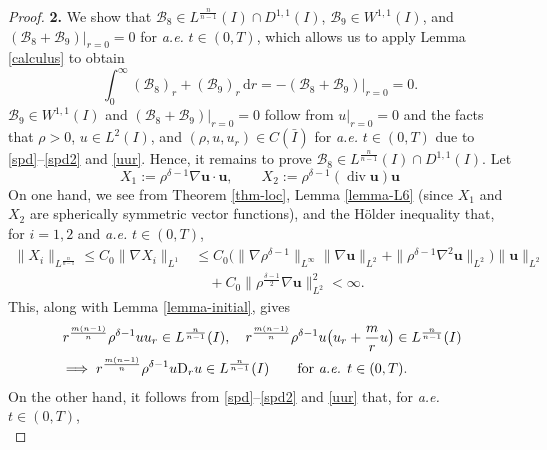 \documentclass[11pt,reqno]{amsart}
\DeclareMathOperator{\diver}{\mathrm{div}}
\numberwithin{rk}{section}
\numberwithin{prop}{section}
\numberwithin{mydef}{section}
\numberwithin{lem}{section}
\numberwithin{equation}{section}
\numberwithin{thm}{section}
\begin{document}
\begin{proof}
\smallskip
\textbf{2.} We show that $\mathcal{B}_8\in L^\frac{n}{n-1}(I)\cap D^{1,1}(I)$, $\mathcal{B}_9\in W^{1,1}(I)$, and $(\mathcal{B}_8+\mathcal{B}_9)|_{r=0}=0$ for {\it a.e.} 
$t\in (0,T)$, which allows us to apply Lemma \ref{calculus} to obtain
\begin{equation}\label{int-B8B9}
\int_0^\infty (\mathcal{B}_8)_r+(\mathcal{B}_9)_r\,\mathrm{d}r=-(\mathcal{B}_8+\mathcal{B}_9)|_{r=0}=0.
\end{equation}
$\mathcal{B}_9\in W^{1,1}(I)$ and $(\mathcal{B}_8+\mathcal{B}_9)|_{r=0}=0$ follow  from $u|_{r=0}=0$ 
and the facts that $\rho>0$, $u\in L^2(I)$, and $(\rho,u,u_r)\in C(\bar I)$ for \textit{a.e.} $t\in (0,T)$ due to \eqref{spd}--\eqref{spd2} and \eqref{uur}. Hence, it remains to prove $\mathcal{B}_8\in L^\frac{n}{n-1}(I)\cap D^{1,1}(I)$. Let 
\begin{equation*}
X_1:=\rho^{\delta-1}\nabla\boldsymbol{u}\cdot \boldsymbol{u},\qquad X_2:=\rho^{\delta-1}(\diver\boldsymbol{u})\boldsymbol{u}
\end{equation*}
On one hand, we see from Theorem \ref{thm-loc}, Lemma \ref{lemma-L6} (since $X_1$ and $X_2$ are spherically symmetric vector functions), and the H\"older inequality that, for $i=1,2$ and \textit{a.e.} $t\in (0,T)$,
\begin{equation*}
\begin{aligned}
\|X_i\|_{L^\frac{n}{n-1}}\leq C_0\|\nabla X_i\|_{L^1}&\leq C_0\big(\|\nabla\rho^{\delta-1}\|_{L^\infty}\|\nabla\boldsymbol{u}\|_{L^2}+\|\rho^{\delta-1}\nabla^2\boldsymbol{u}\|_{L^2}\big)\|\boldsymbol{u}\|_{L^2}\\
&\quad +C_0\|\rho^\frac{\delta-1}{2}\nabla\boldsymbol{u}\|_{L^2}^2<\infty.
\end{aligned}
\end{equation*}
This, along with Lemma \ref{lemma-initial}, gives
\begin{equation}\label{622}
\begin{aligned}
&\ r^\frac{m(n-1)}{n}\rho^{\delta-1}u u_r\in L^\frac{n}{n-1}(I),\quad r^\frac{m(n-1)}{n}\rho^{\delta-1}u \big(u_r+\frac{m}{r}u\big)\in L^\frac{n}{n-1}(I)\\
&\implies r^\frac{m(n-1)}{n}\rho^{\delta-1}u\mathrm{D}_r u\in L^\frac{n}{n-1}(I)\qquad \text{for \textit{a.e.} $t\in (0,T)$}.
\end{aligned}
\end{equation}
On the other hand, it follows from \eqref{spd}--\eqref{spd2} and \eqref{uur} that, for {\it a.e.} $t\in (0,T)$, 
\begin{equation*}

\end{equation*}
\end{proof}
\end{document}
